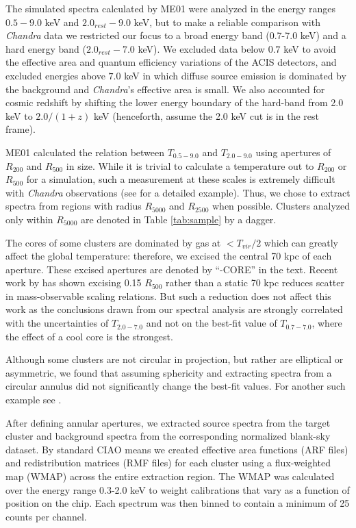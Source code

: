 \documentclass[12pt,preprint]{aastex}
\begin{document}
The simulated spectra calculated by ME01 were analyzed in the energy
ranges $0.5-9.0$ keV and $2.0_{rest}-9.0$ keV, but to make a reliable
comparison with {\it Chandra} data we restricted our focus to a
broad energy band (0.7-7.0 keV) and a hard energy band
($2.0_{rest}-7.0$ keV). We excluded data below $0.7$ keV to avoid the
effective area and quantum efficiency variations of the ACIS
detectors, and excluded energies above $7.0$ keV in which diffuse source
emission is dominated by the background and {\it Chandra}'s
effective area is small. We also accounted for cosmic redshift by
shifting the lower energy boundary of the hard-band from 2.0 keV to
$2.0/(1+z)$ keV (henceforth, assume the 2.0 keV cut is in the rest
frame).

ME01 calculated the relation between $T_{0.5-9.0}$ and $T_{2.0-9.0}$
using apertures of $R_{200}$ and $R_{500}$ in size. While it is
trivial to calculate a temperature out to $R_{200}$ or $R_{500}$ for
a simulation, such a measurement at these scales is extremely
difficult with {\it Chandra} observations (see \cite{2005ApJ...628..655V} for
a detailed example). Thus, we chose to extract spectra from regions
with radius $R_{5000}$ and $R_{2500}$ when possible. Clusters analyzed
only within $R_{5000}$ are denoted in Table \ref{tab:sample} by a
dagger.

The cores of some clusters are dominated by gas at $< T_{vir}/2$ which
can greatly affect the global temperature: therefore, we excised the
central 70 kpc of each aperture. These excised apertures are denoted
by ``-CORE'' in the text. Recent work by \citealt{2007astro.ph..3504M}
has shown excising 0.15 $R_{500}$ rather than a static 70 kpc reduces
scatter in mass-observable scaling relations. But such a reduction
does not affect this work as the conclusions drawn from our spectral
analysis are strongly correlated with the uncertainties of $T_{2.0-7.0}$
and not on the best-fit value of $T_{0.7-7.0}$, where the effect of a
cool core is the strongest.

Although some clusters are not circular in projection, but rather are
elliptical or asymmetric, we found that assuming sphericity and
extracting spectra from a circular annulus did not significantly
change the best-fit values. For another such example see
\cite{2005MNRAS.359.1481B}.

After defining annular apertures, we extracted source spectra from the
target cluster and background spectra from the corresponding
normalized blank-sky dataset. By standard {\textsc{CIAO}} means we created
effective area functions (ARF files) and redistribution matrices (RMF
files) for each cluster using a flux-weighted map (WMAP) across the
entire extraction region. The WMAP was calculated over the energy
range 0.3-2.0 keV to weight calibrations that vary as a function of
position on the chip. Each spectrum was then binned to contain a
minimum of 25 counts per channel.
\end{document}

